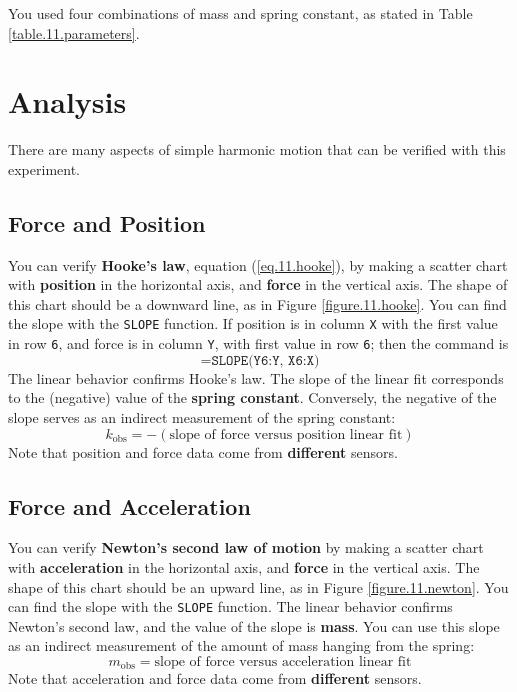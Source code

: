 You used four combinations of mass and spring constant, as stated in Table \ref{table.11.parameters}.
%
\section{Analysis}
%
There are many aspects of simple harmonic motion that can be verified with this experiment.
%
\subsection{Force and Position}
%
You can verify \textbf{Hooke's law}, equation (\ref{eq.11.hooke}), by making a scatter chart with \textbf{position} in the horizontal axis, and \textbf{force} in the vertical axis. The shape of this chart should be a downward line, as in Figure \ref{figure.11.hooke}. You can find the slope with the \texttt{SLOPE} function. If position is in column \texttt{X} with the first value in row \texttt{6}, and force is in column \texttt{Y}, with first value in row \texttt{6}; then the command is
\begin{equation}
    \texttt{=SLOPE(Y6:Y, X6:X)}
\end{equation}
The linear behavior confirms Hooke's law. The slope of the linear fit corresponds to the (negative) value of the \textbf{spring constant}. Conversely, the negative of the slope serves as an indirect measurement of the spring constant:
\begin{equation}
    k_{\text{obs}} = - (\text{slope of force versus position linear fit})
\end{equation}
Note that position and force data come from \textbf{different} sensors.
%
\subsection{Force and Acceleration}
%
You can verify \textbf{Newton's second law of motion} by making a scatter chart with \textbf{acceleration} in the horizontal axis, and \textbf{force} in the vertical axis. The shape of this chart should be an upward line, as in Figure \ref{figure.11.newton}. You can find the slope with the \texttt{SLOPE} function. The linear behavior confirms Newton's second law, and the value of the slope is \textbf{mass}. You can use this slope as an indirect measurement of the amount of mass hanging from the spring:
\begin{equation}
    m_{\text{obs}} = \text{slope of force versus acceleration linear fit}
\end{equation}
Note that acceleration and force data come from \textbf{different} sensors.

